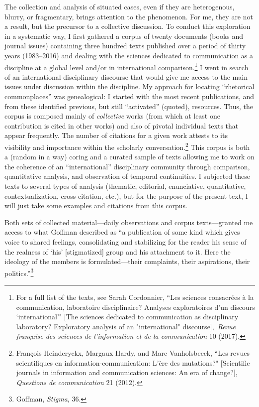 \documentclass{tufte-handout}
\begin{document}
The collection and analysis of situated cases, even if they are
heterogenous, blurry, or fragmentary, brings attention to the
phenomenon. For me, they are not a result, but the precursor to a
collective discussion. To conduct this exploration in a systematic way,
I first gathered a corpus of twenty documents (books and journal issues)
containing three hundred texts published over a period of thirty years
(1983--2016) and dealing with the sciences dedicated to communication as
a discipline at a global level and/or in international
comparison.\footnote{For a full list of the texts, see Sarah Cordonnier,
  ``Les sciences consacrées à la communication, laboratoire
  disciplinaire? Analyses exploratoires d'un discours `international'"
  {[}The sciences dedicated to communication as disciplinary laboratory?
  Exploratory analysis of an "international" discourse{]},~\emph{Revue
  française des sciences de l'information et de la communication} 10
  (2017).} I went in search of an international disciplinary discourse
that would give me access to the main issues under discussion within the
discipline. My approach for locating ``rhetorical commonplaces'' was
genealogical: I started with the most recent publications, and from
these identified previous, but still ``activated'' (quoted), resources.
Thus, the corpus is composed mainly of \emph{collective} works (from
which at least one contribution is cited in other works) and also of
pivotal individual texts that appear frequently. The number of citations
for a given work attests to its visibility and importance within the
scholarly conversation.\footnote{François Heinderyckx, Margaux Hardy,
  and Marc Vanholsbeeck, ``Les revues scientifiques en
  information-communication: L'ère des mutations?" {[}Scientific
  journals in information and communication sciences: An era of
  change?{]}, \emph{Questions de communication} 21 (2012).} This corpus
is both a (random in a way) coring and a curated sample of texts
allowing me to work on the coherence of an ``international''
disciplinary community through comparison, quantitative analysis, and
observation of temporal continuities. I subjected these texts to several
types of analysis (thematic, editorial, enunciative, quantitative,
contextualization, cross-citation, etc.), but for the purpose of the
present text, I will just take some examples and citations from this
corpus.

Both sets of collected material---daily observations and corpus
texts---granted me access to what Goffman described as ``a publication
of some kind which gives voice to shared feelings, consolidating and
stabilizing for the reader his sense of the realness of `his'
{[}stigmatized{]} group and his attachment to it. Here the ideology of
the members is formulated---their complaints, their aspirations, their
politics.''\footnote{Goffman, \emph{Stigma}, 36.}
\end{document}
